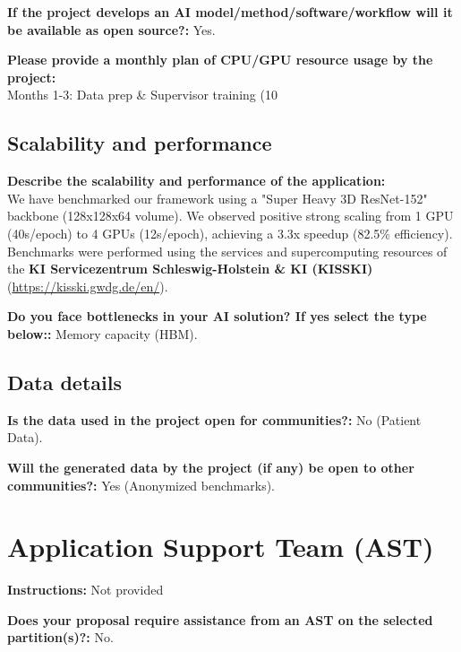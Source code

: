 \documentclass[11pt, a4paper]{article}
\begin{document}
\vspace{0.5em}
\noindent\textbf{If the project develops an AI model/method/software/workflow will it be available as open source?:} Yes.

\vspace{0.5em}
\noindent\textbf{Please provide a monthly plan of CPU/GPU resource usage by the project:} \\
Months 1-3: Data prep & Supervisor training (10%

\subsection*{Scalability and performance}

\noindent\textbf{Describe the scalability and performance of the application:} \\
We have benchmarked our framework using a "Super Heavy 3D ResNet-152" backbone (128x128x64 volume). We observed positive strong scaling from 1 GPU (40s/epoch) to 4 GPUs (12s/epoch), achieving a 3.3x speedup (82.5\% efficiency). Benchmarks were performed using the services and supercomputing resources of the \textbf{KI Servicezentrum Schleswig-Holstein \& KI (KISSKI)} (\url{https://kisski.gwdg.de/en/}).

\vspace{0.5em}
\noindent\textbf{Do you face bottlenecks in your AI solution? If yes select the type below::} Memory capacity (HBM).

\subsection*{Data details}

\noindent\textbf{Is the data used in the project open for communities?:} No (Patient Data).

\vspace{0.5em}
\noindent\textbf{Will the generated data by the project (if any) be open to other communities?:} Yes (Anonymized benchmarks).

\section*{Application Support Team (AST)}

\noindent\textbf{Instructions:} Not provided

\vspace{0.5em}
\noindent\textbf{Does your proposal require assistance from an AST on the selected partition(s)?:} No.
\end{document}
